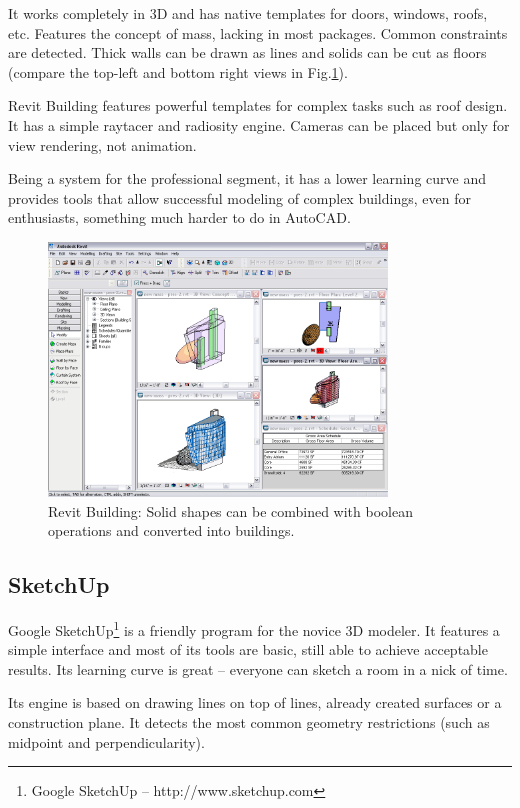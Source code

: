 It works completely in 3D and has native templates for doors, windows, roofs, etc.
Features the concept of mass, lacking in most packages.
Common constraints are detected. Thick walls can be drawn as lines and solids can
be cut as floors (compare the top-left and bottom right views in Fig.\ref{FIG-REVIT}).

Revit Building features powerful templates for complex tasks such as roof design.
It has a simple raytacer and radiosity engine. Cameras can be placed but only for view
rendering, not animation.

Being a system for the professional segment, it has a lower learning curve and provides
tools that allow successful modeling of complex buildings, even for enthusiasts,
something much harder to do in AutoCAD.

\begin{figure}[!ht]
    \centering
    \includegraphics[width=9cm]{gfx/revit-1.png}
    \caption{Revit Building: Solid shapes can be combined with boolean operations and converted into buildings.}
    \label{FIG-REVIT}
\end{figure}

\subsection{SketchUp}
Google SketchUp\footnote{Google SketchUp -- http://www.sketchup.com}
is a friendly program for the novice 3D modeler.
It features a simple interface and most of its tools are basic,
still able to achieve acceptable results.
Its learning curve is great -- everyone can sketch a room in a nick of time.

Its engine is based on drawing lines on top of lines,
already created surfaces or a construction plane.
It detects the most common geometry restrictions (such as midpoint and perpendicularity).

